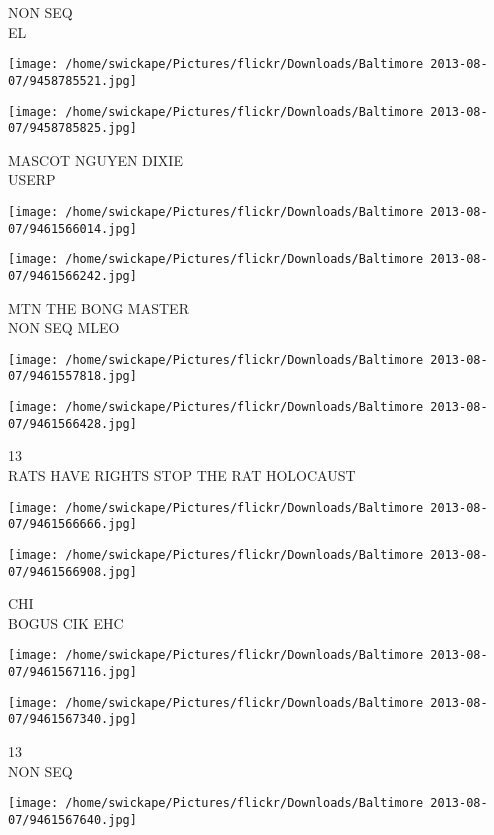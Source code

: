 \documentclass[10pt,letterpaper]{article}
\begin{document}
NON SEQ\\
EL
\pagebreak

\texttt{[image: /home/swickape/Pictures/flickr/Downloads/Baltimore 2013-08-07/9458785521.jpg]}

\vspace{0.25in}
\texttt{[image: /home/swickape/Pictures/flickr/Downloads/Baltimore 2013-08-07/9458785825.jpg]}

MASCOT NGUYEN DIXIE\\
USERP
\pagebreak

\texttt{[image: /home/swickape/Pictures/flickr/Downloads/Baltimore 2013-08-07/9461566014.jpg]}

\vspace{0.25in}
\texttt{[image: /home/swickape/Pictures/flickr/Downloads/Baltimore 2013-08-07/9461566242.jpg]}

MTN THE BONG MASTER\\
NON SEQ MLEO
\pagebreak

\texttt{[image: /home/swickape/Pictures/flickr/Downloads/Baltimore 2013-08-07/9461557818.jpg]}

\vspace{0.25in}
\texttt{[image: /home/swickape/Pictures/flickr/Downloads/Baltimore 2013-08-07/9461566428.jpg]}

13\\
RATS HAVE RIGHTS STOP THE RAT HOLOCAUST
\pagebreak

\texttt{[image: /home/swickape/Pictures/flickr/Downloads/Baltimore 2013-08-07/9461566666.jpg]}

\vspace{0.25in}
\texttt{[image: /home/swickape/Pictures/flickr/Downloads/Baltimore 2013-08-07/9461566908.jpg]}

CHI\\
BOGUS CIK EHC
\pagebreak

\texttt{[image: /home/swickape/Pictures/flickr/Downloads/Baltimore 2013-08-07/9461567116.jpg]}

\vspace{0.25in}
\texttt{[image: /home/swickape/Pictures/flickr/Downloads/Baltimore 2013-08-07/9461567340.jpg]}

13\\
NON SEQ
\pagebreak

\texttt{[image: /home/swickape/Pictures/flickr/Downloads/Baltimore 2013-08-07/9461567640.jpg]}
\end{document}
